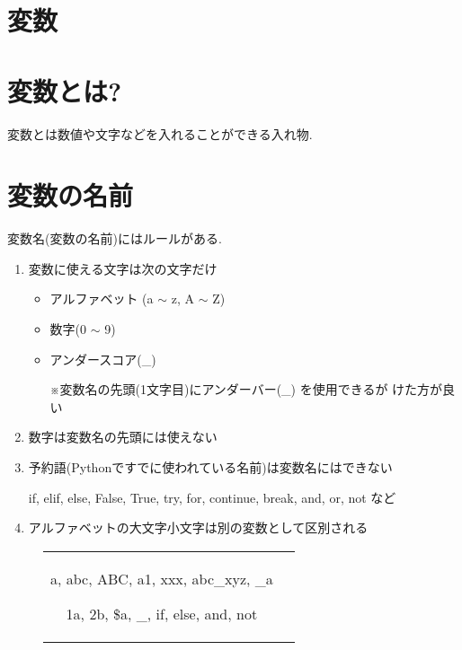 \documentclass[dvipdfmx]{jsbook}
\newcommand{\countup}[1]{\setcounter{chapter}{#1} \setcounter{section}{0}}
\newcommand{\info}[2]{\begin{tcolorbox}[colframe=gray, colback=black!10!white, coltitle=white, fonttitle=\bfseries, title={#1}]
{#2}\end{tcolorbox}}
\begin{document}

\section*{変数}
\countup{1}
\section{変数とは?}
変数とは数値や文字などを入れることができる入れ物.
\section{変数の名前}
変数名(変数の名前)にはルールがある.
\begin{enumerate}
	\item 変数に使える文字は次の文字だけ
	      \begin{itemize}
		      \item アルファベット (a $\sim$ z, A $\sim$ Z)
		      \item 数字(0 $\sim$ 9)
		      \item アンダースコア(\_) \par
		            ※変数名の先頭(1文字目)にアンダーバー(\_) を使用できるが けた方が良い
	      \end{itemize}
	\item 数字は変数名の先頭には使えない
	\item 予約語(Pythonですでに使われている名前)は変数名にはできない
	      \info{予約語の例}{if, \; elif, \; else, \; False, \; True, \; try, \; for, \; continue, \; break, \; and, \; or, \; not \; など}
	\item アルファベットの大文字小文字は別の変数として区別される
\end{enumerate}

\begin{figure}[htp]
	\begin{tabular}{cc} \hspace{2truemm}
		\begin{minipage}[ht]{.46\textwidth}
			\begin{tcolorbox}[colframe=blue!75!black,
					colback=blue!10!white,
					coltitle=white, fonttitle=\bfseries,
					title=変数名として使える名前の例]
				a, \;abc, \;ABC,\; a1, \; xxx, \; abc\_xyz, \; \_a
			\end{tcolorbox}
		\end{minipage} \hspace{4truemm}
		\begin{minipage}[ht]{.46\textwidth}
			\begin{tcolorbox}[colframe=red!75!black,
					colback=red!10!white,
					coltitle=white, fonttitle=\bfseries,
					title=変数名として使えない名前の例]
				1a, \; 2b, \;  \$a, \; 1\_, \; if, \; else, \; and, \; not
			\end{tcolorbox}
		\end{minipage}
	\end{tabular}
\end{figure}
\end{document}
